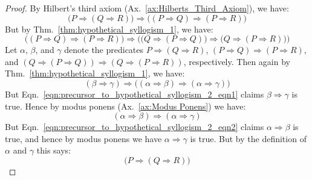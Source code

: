    \begin{proof}
        By Hilbert's third axiom (Ax.~\ref{ax:Hilberts_Third_Axiom}), we have:
        \begin{equation}
            \label{eqn:precursor_to_hypothetical_syllogism_2_eqn1}%
            \big(
                P\Rightarrow(Q\Rightarrow{R})
            \big)
            \Rightarrow
            \big(
                (P\Rightarrow{Q})\Rightarrow(P\Rightarrow{R})
            \big)
        \end{equation}
        But by Thm.~\ref{thm:hypothetical_syllogism_1}, we have:
        \begin{equation}
            \label{eqn:precursor_to_hypothetical_syllogism_2_eqn2}%
            \big(
                (P\Rightarrow{Q})\Rightarrow(P\Rightarrow{R})
            \big)
            \Rightarrow
            \Big(
                \big(
                    Q\Rightarrow(P\Rightarrow{Q})
                \big)
                \Rightarrow
                \big(
                    Q\Rightarrow(P\Rightarrow{R})
                \big)
            \Big)
        \end{equation}
        Let $\alpha$, $\beta$, and $\gamma$ denote the predicates
        $P\Rightarrow(Q\Rightarrow{R})$,
        $(P\Rightarrow{Q})\Rightarrow(P\Rightarrow{R})$, and
        $(Q\Rightarrow(P\Rightarrow{Q}))\Rightarrow%
         (Q\Rightarrow(P\Rightarrow{R}))$, respectively. Then again by
        Thm.~\ref{thm:hypothetical_syllogism_1}, we have:
        \begin{equation}
            (\beta\Rightarrow\gamma)\Rightarrow
            \big(
                (\alpha\Rightarrow\beta)\Rightarrow(\alpha\Rightarrow\gamma)
            \big)
        \end{equation}
        But Eqn.~\ref{eqn:precursor_to_hypothetical_syllogism_2_eqn1} claims
        $\beta\Rightarrow\gamma$ is true. Hence by modus ponens
        (Ax.~\ref{ax:Modus Ponens}) we have:
        \begin{equation}
            (\alpha\Rightarrow\beta)\Rightarrow(\alpha\Rightarrow\gamma)
        \end{equation}
        But Eqn.~\ref{eqn:precursor_to_hypothetical_syllogism_2_eqn2} claims
        $\alpha\Rightarrow\beta$ is true, and hence by modus ponens we have
        $\alpha\Rightarrow\gamma$ is true. But by the definition of $\alpha$ and
        $\gamma$ this says:
        \begin{equation}
            \big(
                P\Rightarrow(Q\Rightarrow{R})
            \big)

\end{equation}
\end{proof}
